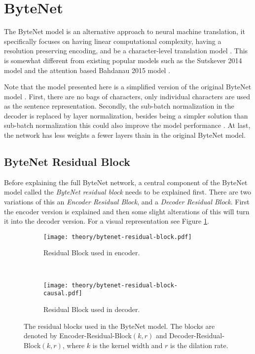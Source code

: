 \section{ByteNet}
\label{sec:theory:bytenet}

The ByteNet model is an alternative approach to neural machine translation, it specifically focuses on having linear computational complexity, having a resolution preserving encoding, and be a character-level translation model \cite{bytenet}. This is somewhat different from existing popular models such as the Sutskever 2014 model \cite{sutskever-2014-nmt} and the attention based Bahdanau 2015 model \cite{bahdanau-2015-nmt}.

Note that the model presented here is a simplified version of the original ByteNet model \cite{bytenet}. First, there are no bags of characters, only individual characters are used as the sentence representation. Secondly, the sub-batch normalization in the decoder is replaced by layer normalization, besides being a simpler solution than sub-batch normalization this could also improve the model performance \cite{layer-normalization}. At last, the network has less weights a fewer layers thain in the original ByteNet model.

\subsection{ByteNet Residual Block}

Before explaining the full ByteNet network, a central component of the ByteNet model called the \textit{ByteNet residual block} needs to be explained first. There are two variations of this an \textit{Encoder Residual Block}, and a \textit{Decoder Residual Block}. First the encoder version is explained and then some slight alterations of this will turn it into the decoder version. For a visual representation see Figure \ref{fig:bytenet:residual-block}.

\begin{figure}[h]
    \centering
    \begin{subfigure}[b]{0.45\textwidth}
        \centering
        \texttt{[image: theory/bytenet-residual-block.pdf]}
        \caption{Residual Block used in encoder.}
    \end{subfigure}
    ~ %
    \begin{subfigure}[b]{0.45\textwidth}
        \centering
        \texttt{[image: theory/bytenet-residual-block-causal.pdf]}
        \caption{Residual Block used in decoder.}
    \end{subfigure}
    \caption{The residual blocks used in the ByteNet model. The blocks are denoted by Encoder-Residual-Block$(k,r)$ and Decoder-Residual-Block$(k,r)$, where $k$ is the kernel width and $r$ is the dilation rate.}
    \label{fig:bytenet:residual-block}
\end{figure}

